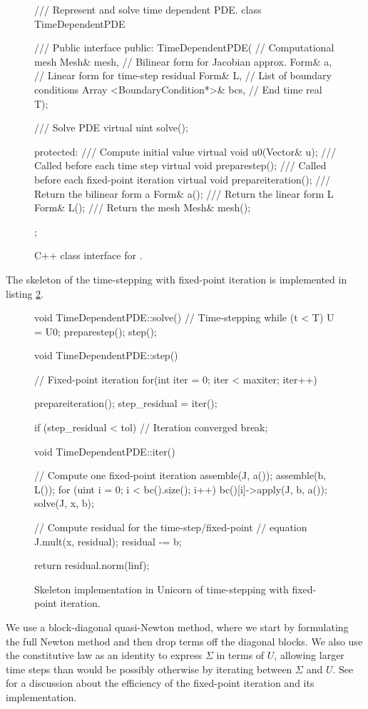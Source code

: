 \begin{figure}
\begin{c++}
/// Represent and solve time dependent PDE.
class TimeDependentPDE
{
  /// Public interface
public:
  TimeDependentPDE(
   // Computational mesh
   Mesh& mesh,
   // Bilinear form for Jacobian approx.
   Form& a,
   // Linear form for time-step residual
   Form& L,
   // List of boundary conditions
   Array <BoundaryCondition*>& bcs,
   // End time
   real T);

  /// Solve PDE
  virtual uint solve();

protected:
  /// Compute initial value
  virtual void u0(Vector& u);
  /// Called before each time step
  virtual void preparestep();
  /// Called before each fixed-point iteration
  virtual void prepareiteration();
  /// Return the bilinear form a
  Form& a();
  /// Return the linear form L
  Form& L();
  /// Return the mesh
  Mesh& mesh();
};
\end{c++}
\caption{C++ class interface for .}
\label{code:TimeDependentPDE}
\end{figure}
The skeleton of the time-stepping with fixed-point iteration is
implemented in listing \ref{code:time-stepping}.

\begin{figure}
\begin{c++}
void TimeDependentPDE::solve()
{
  // Time-stepping
  while (t < T)
  {
    U = U0;
    preparestep();
    step();
  }
}

void TimeDependentPDE::step()
{
  // Fixed-point iteration
  for(int iter = 0; iter < maxiter; iter++)
  {
    prepareiteration();
    step_residual = iter();

    if (step_residual < tol)
    {
      // Iteration converged
      break;
    }
  }
}

void TimeDependentPDE::iter()
{
  // Compute one fixed-point iteration
  assemble(J, a());
  assemble(b, L());
  for (uint i = 0; i < bc().size(); i++)
    bc()[i]->apply(J, b, a());
  solve(J, x, b);

  // Compute residual for the time-step/fixed-point
  // equation
  J.mult(x, residual);
  residual -= b;

  return residual.norm(linf);
}
\end{c++}
\caption{Skeleton implementation in Unicorn of time-stepping with
fixed-point iteration.}
\label{code:time-stepping}
\end{figure}

We use a block-diagonal quasi-Newton method, where we start by
formulating the full Newton method and then drop terms off the
diagonal blocks. We also use the constitutive law as an identity to
express $\Sigma$ in terms of $U$, allowing larger time steps than
would be possibly otherwise by iterating between $\Sigma$ and $U$.
See \citet{Jansson2009} for a discussion about the efficiency of the
fixed-point iteration and its implementation.

